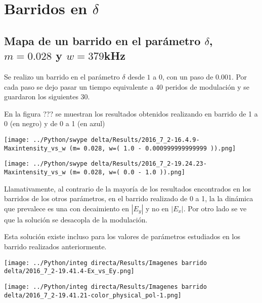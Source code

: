 				
			
	\section{Barridos en $\delta$}
			
		\subsection{Mapa de un barrido en el parámetro $\delta$, $m=0.028$ y $w=379$kHz}
		
		Se realizo un barrido en el parámetro $\delta$ desde $1$  a $0$, con un paso de $0.001$.
		Por cada paso se dejo pasar un tiempo equivalente a 40 peridos de modulación y se guardaron los siguientes 30.
		
		En la figura ??? se muestran los resultados obtenidos realizando en barrido de 1 a 0 (en negro) y de 0 a 1 (en azul) 
		
				\begin{minipage}{0.5\textwidth}
					\centering
					\texttt{[image: ../Python/swype delta/Results/2016\_7\_2-16.4.9-Maxintensity\_vs\_w (m= 0.028, w=( 1.0 - 0.000999999999999 )).png]}
				\end{minipage}	
				\begin{minipage}{0.5\textwidth}
					\centering
					\texttt{[image: ../Python/swype delta/Results/2016\_7\_2-19.24.23-Maxintensity\_vs\_w (m= 0.028, w=( 0.0 - 1.0 )).png]}
				\end{minipage}	
				
				Llamativamente, al contrario de la mayoría de los resultados encontrados en los barridos de los otros parámetros, en el barrido realizado de 0 a 1, la la dinámica que prevalece es una con decaimiento en $|E_y|$ y no en $|E_x|$. Por otro lado se ve que la solución se desacopla de la modulación. 
				
				Esta solución existe incluso para los valores de parámetros estudiados en los barrido realizados anteriormente.
				
				\begin{minipage}{0.5\textwidth}
					\centering
					\texttt{[image: ../Python/integ directa/Results/Imagenes barrido delta/2016\_7\_2-19.41.4-Ex\_vs\_Ey.png]}
				\end{minipage}	
				\begin{minipage}{0.5\textwidth}
					\centering
					\texttt{[image: ../Python/integ directa/Results/Imagenes barrido delta/2016\_7\_2-19.41.21-color\_physical\_pol-1.png]}
				\end{minipage}			
				
